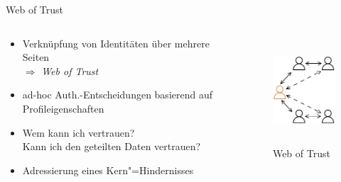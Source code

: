 \begin{frame}{Web of Trust \footnotesize\cite{sambraSolidPlatformDecentralized2016}}
    \begin{columns}
        \begin{column}{0.6\textwidth}
            \begin{itemize}
                \item Verknüpfung von Identitäten über mehrere Seiten\\
                $\Rightarrow$ \emph{Web of Trust}
                
                \item[$\Rightarrow$]<2-> ad-hoc Auth.-Entscheidungen basierend auf Profileigenschaften
                
                \item[$\Rightarrow$]<3-> Wem kann ich vertrauen?\\ Kann ich den geteilten Daten vertrauen?
                
                \item[$\Rightarrow$]<4-> Adressierung eines Kern"=Hindernisses
            \end{itemize}
        \end{column}
        
        \begin{column}{0.4\textwidth}
            \vspace{1em}
            \begin{figure}
                \includegraphics[height=4cm]{./assets/web_of_trust.drawio.pdf}
                \caption{Web of Trust}
            \end{figure}
        \end{column}
    \end{columns}
\end{frame}


